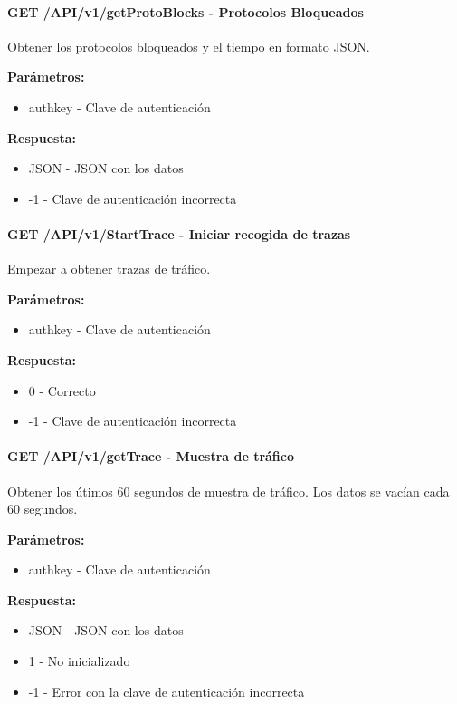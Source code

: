 \paragraph{\textbf{GET} /API/v1/getProtoBlocks - Protocolos Bloqueados}
Obtener los protocolos bloqueados y el tiempo en formato JSON.

\textbf{Parámetros:}

\begin{itemize}
\item authkey - Clave de autenticación
\end{itemize}
\textbf{Respuesta:}
\begin{itemize}
\item JSON - JSON con los datos
\item -1 - Clave de autenticación incorrecta
\end{itemize}

\paragraph{\textbf{GET}  /API/v1/StartTrace - Iniciar recogida de trazas}
Empezar a obtener trazas de tráfico.

\textbf{Parámetros:}

\begin{itemize}
\item authkey - Clave de autenticación
\end{itemize}
\textbf{Respuesta:}
\begin{itemize}
\item 0 - Correcto
\item -1 - Clave de autenticación incorrecta
\end{itemize}

\paragraph{\textbf{GET}  /API/v1/getTrace - Muestra de tráfico}
Obtener los útimos 60 segundos de muestra de tráfico. Los datos se vacían cada 60 segundos.

\textbf{Parámetros:}
\begin{itemize}
\item authkey - Clave de autenticación
\end{itemize}
\textbf{Respuesta:}
\begin{itemize}
\item JSON - JSON con los datos
\item 1 - No inicializado
\item -1 - Error con la clave de autenticación incorrecta
\end{itemize}
